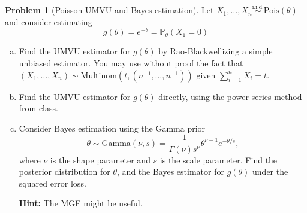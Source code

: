 \documentclass{article}
\newcommand{\PP}{\mathbb{P}}
\newcommand{\simiid}{\overset{\text{i.i.d.}}{\sim}}
\theoremstyle{definition}
\newtheorem{problem}{Problem}
\begin{document}
\begin{problem}[Poisson UMVU and Bayes estimation]

Let $X_1,\ldots,X_n \simiid \text{Pois}(\theta)$ and consider estimating 
\[
g(\theta) = e^{-\theta} = \PP_\theta(X_1 = 0)
\]

\begin{enumerate}[(a)]
\item Find the UMVU estimator for $g(\theta)$ by Rao-Blackwellizing a simple unbiased estimator. You may use without proof the fact that $(X_1,\ldots,X_n) \sim \text{Multinom}(t, (n^{-1},\ldots,n^{-1}) )$ given $\sum_{i=1}^n X_i = t$.



\item Find the UMVU estimator for $g(\theta)$ directly, using the power series method from class.



\item Consider Bayes estimation using the Gamma prior 
\[
\theta \sim \text{Gamma}(\nu, s) = \frac{1}{\Gamma(\nu)s^{\nu}} \theta^{\nu - 1}e^{-\theta/s},
\]
where $\nu$ is the shape parameter and $s$ is the scale parameter. Find the posterior distribution for $\theta$, and the Bayes estimator for $g(\theta)$ under the squared error loss.

{\bf Hint:} The MGF might be useful.

\end{enumerate}
\end{problem}
\end{document}
